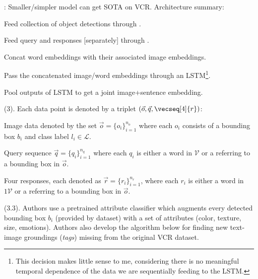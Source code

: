 \documentclass[11pt]{article}
\begin{document}
: Smaller/simpler model can get SOTA on VCR. Architecture summary:
\begin{compactenum}
	\item Feed collection of object detections through . 
	
	\item Feed query and responses [separately] through . 
	
	\item Concat word embeddings with their associated image embeddings. 
	
	\item Pass the concatenated image/word embeddings through an LSTM\footnote{This decision makes little sense to me, considering there is no meaningful temporal dependence of the data we are sequentially feeding to the LSTM.}.
	
	\item Pool outputs of LSTM to get a joint image+sentence embedding.
\end{compactenum}




 (3). Each data point is denoted by a triplet $(\vec o, \vec q, \vecseq[4]{r})$:
\begin{compactitem}
	\item Image data denoted by the set $\vec o = \{o_i\}_{i=1}^{n_o}$ where each $o_i$ consists of a bounding box $b_i$ and class label $l_i \in \mathcal L$.
	
	\item Query sequence $\vec q = \{q_i\}_{i=1}^{n_q}$ where each $q_i$ is either a word  in $\mathcal V$ or a  referring to a bounding box in $\vec o$. 
	
	\item Four responses, each denoted as $\vec r = \{r_i\}_{i=1}^{n_r}$, where each $r_i$  is either a word  in $1\mathcal V$ or a  referring to a bounding box in $\vec o$. 
\end{compactitem}


 (3.3). Authors use a pretrained attribute classifier which augments every detected bounding box $b_i$ (provided by dataset) with a set of attributes (color, texture, size, emotions). Authors also develop the algorithm below for finding new text-image groundings (\textit{tags}) missing from the original VCR dataset. 
\end{document}
